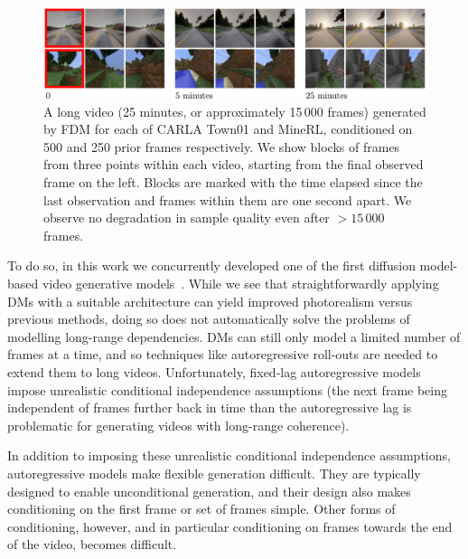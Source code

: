 \begin{figure}[t]
    \centering
    \includegraphics[width=\textwidth]{figs/fdm/fig1.pdf}
    \caption{A long video (25 minutes, or approximately 15\,000 frames) generated by FDM for each of CARLA Town01 and MineRL, conditioned on 500 and 250 prior frames respectively. We show blocks of frames from three points within each video, starting from the final observed frame on the left. Blocks are marked with the time elapsed since the last observation and frames within them are one second apart. We observe no degradation in sample quality even after $>15\,000$ frames.}
    \label{fig:1}
\end{figure}

To do so, in this work we concurrently developed one of the first diffusion model-based video generative models~\cite{ho2022video,yang2022diffusion,voleti2022mcvd}. While we see that straightforwardly applying DMs with a suitable architecture can yield improved photorealism versus previous methods, doing so does not automatically solve the problems of modelling long-range dependencies. DMs can still only model a limited number of frames at a time, and so techniques like autoregressive roll-outs are needed to extend them to long videos. Unfortunately, fixed-lag autoregressive models impose unrealistic conditional independence assumptions (the next frame being independent of frames further back in time than the autoregressive lag is problematic for generating videos with long-range coherence).  

In addition to imposing these unrealistic conditional independence assumptions, autoregressive models make flexible generation difficult. They are typically designed to enable unconditional generation, and their design also makes conditioning on the first frame or set of frames simple. Other forms of conditioning, however, and in particular conditioning on frames towards the end of the video, becomes difficult.

